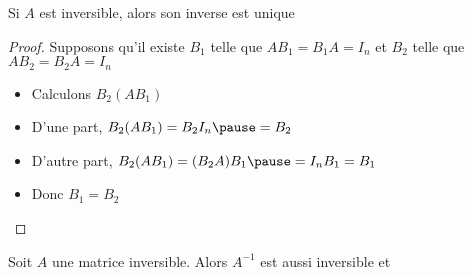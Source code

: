 \begin{frame}

\begin{proposition}%
Si $A$ est inversible, alors son inverse est unique
\end{proposition}

\pause
\begin{proof} 
Supposons qu'il existe $B_{1}$ telle que $AB_{1}=B_{1}A=I_{n}$ et $B_{2}$ telle que 
$AB_{2}=B_{2}A=I_{n}$

\begin{itemize}
\item\pause Calculons $B_{2}(AB_{1})$
\item\pause D'une part, $B_{2}(AB_{1})=B_{2} I_n \pause = B_2$
\item\pause D'autre part, $B_{2}(AB_{1})=(B_{2}A)B_{1}\pause=I_{n}B_{1}=B_{1}$
\item\pause Donc $B_{1}=B_{2}$
\end{itemize}
\end{proof}
\end{frame}


\begin{frame}

\begin{proposition}%
Soit $A$ une matrice inversible. Alors 
$A^{-1}$ est aussi inversible 
\pause
et
\end{proposition}



\end{frame}


